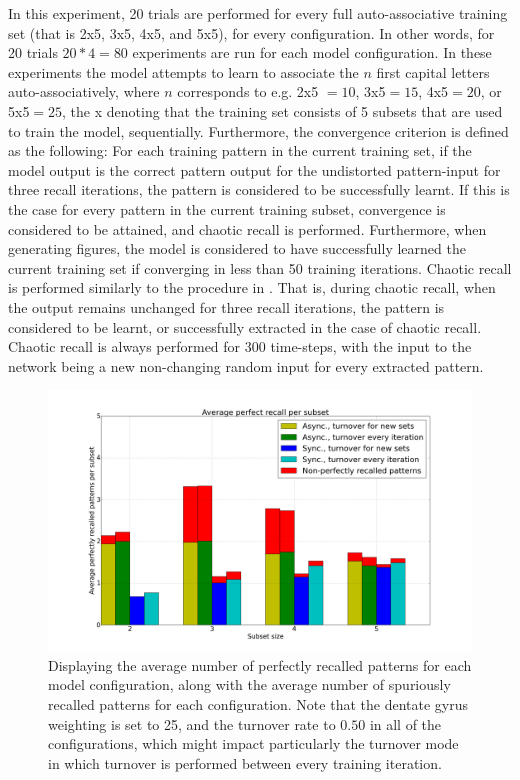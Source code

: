 In this experiment, 20 trials are performed for every full auto-associative training set (that is 2x5, 3x5, 4x5, and 5x5), for every configuration. In other words, for 20 trials $20 * 4 = 80$ experiments are run for each model configuration. In these experiments the model attempts to learn to associate the $n$ first capital letters auto-associatively, where $n$ corresponds to e.g. 2x5 $= 10$, 3x5$=15$, 4x5$=20$, or 5x5$=25$, the x denoting that the training set consists of 5 subsets that are used to train the model, sequentially. 
Furthermore, the convergence criterion is defined as the following: For each training pattern in the current training set, if the model output is the correct pattern output for the undistorted pattern-input for three recall iterations, the pattern is considered to be successfully learnt. If this is the case for every pattern in the current training subset, convergence is considered to be attained, and chaotic recall is performed. Furthermore, when generating figures, the model is considered to have successfully learned the current training set if converging in less than 50 training iterations. Chaotic recall is performed similarly to the procedure in \citep{Hattori2010, Hattori2014}. That is, during chaotic recall, when the output remains unchanged for three recall iterations, the pattern is considered to be learnt, or successfully extracted in the case of chaotic recall. Chaotic recall is always performed for 300 time-steps, with the input to the network being a new non-changing random input for every extracted pattern.


\begin{figure}
    \centering
    \includegraphics[width=14cm]{fig/average_perfect_recall_rates_by_set_size_with_spurious_bars}
    \caption{Displaying the average number of perfectly recalled patterns for each model configuration, along with the average number of spuriously recalled patterns for each configuration. Note that the dentate gyrus weighting is set to 25, and the turnover rate to $0.50$ in all of the configurations, which might impact particularly the turnover mode in which turnover is performed between every training iteration.}
    \label{fig:avg_perfect_recall_rates_with_spurious_bars}
\end{figure}

